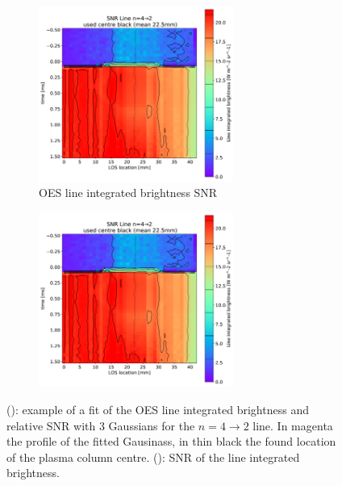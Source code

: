 \begin{figure}
\begin{subfigure}{0.14\linewidth}
     \end{subfigure}
     \begin{subfigure}{0.8\linewidth}
         \centering
         \includegraphics[width=0.7\textwidth,trim={20 220 650 400},clip]{Chapters/chapter3/figs/line4SNR.jpg}
         \caption{OES line integrated brightness SNR}
         \label{fig:sampling4b}
     \end{subfigure}
     \begin{subfigure}{0.095\linewidth}
         \vspace*{-10mm}
         \hspace*{-20mm}
         \includegraphics[width=0.7\textwidth,trim={3000 0 125 40},clip]{Chapters/chapter3/figs/line4SNR.jpg}
     \end{subfigure}
        \caption{(): example of a fit of the OES line integrated brightness and relative SNR with 3 Gaussians for the $n=4\rightarrow 2$ line. In magenta the profile of the fitted Gausinass, in thin black the found location of the plasma column centre. (): SNR of the line integrated brightness.}
        \label{fig:sampling4}
\end{figure}

